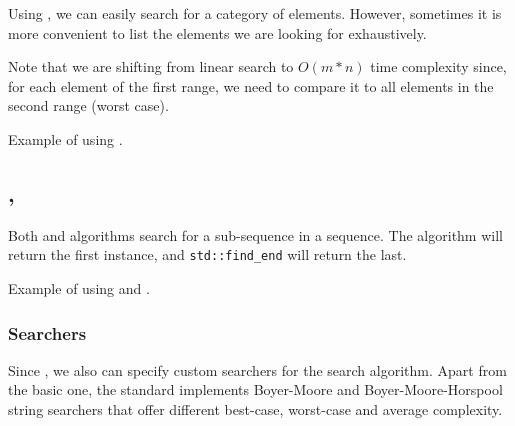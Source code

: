 Using , we can easily search for a category of elements. However, sometimes it is more convenient to list the elements we are looking for exhaustively.


Note that we are shifting from linear search to $O(m*n)$ time complexity since, for each element of the first range, we need to compare it to all elements in the second range (worst case).

\begin{codebox}[]{\href{https://compiler-explorer.com/z/YnTGErxTo}{\ExternalLink}}
\footnotesize Example of using .
\tcblower
{}
\end{codebox}

\subsection{\texorpdfstring{, }{\texttt{std::search}, \texttt{std::find\_end}}}

Both  and  algorithms search for a sub-sequence in a sequence.
The  algorithm will return the first instance, and \texttt{std::find\-\_end} will return the last.


\begin{codebox}[]{\href{https://compiler-explorer.com/z/Gq94oEo9K}{\ExternalLink}}
\footnotesize Example of using  and .
\tcblower
{}
\end{codebox}

\subsubsection{Searchers}

Since , we also can specify custom searchers for the search algorithm. Apart from the basic one, the standard implements Boyer-Moore and Boyer-Moore-Horspool string searchers that offer different best-case, worst-case and average complexity.

